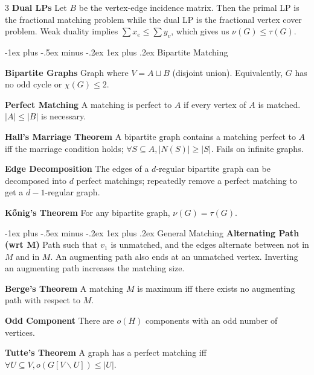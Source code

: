 \documentclass[10pt, landscape]{article}
\makeatletter
\renewcommand{\subsection}{\@startsection{subsection}{3}{0mm}%
                                {-1ex plus -.5ex minus -.2ex}%
                                {1ex plus .2ex}%
                                {\normalfont\small\bfseries}}%
\makeatother
\begin{document}
\begin{multicols*}{3}
\textbf{Dual LPs} Let $B$ be the vertex-edge incidence matrix. Then the primal LP is the fractional matching problem while the dual LP is the fractional vertex cover problem. Weak duality implies $\sum x_e \leq \sum y_v$, which gives us $\nu(G) \leq \tau(G)$.

\subsection{Bipartite Matching}

\textbf{Bipartite Graphs} Graph where $V=A \sqcup B$ (disjoint union). Equivalently, $G$ has no odd cycle or $\chi(G) \leq 2$.

\textbf{Perfect Matching} A matching is perfect to $A$ if every vertex of $A$ is matched. $|A| \leq |B|$ is necessary.

\textbf{Hall's Marriage Theorem} A bipartite graph contains a matching perfect to $A$ iff the marriage condition holds; $\forall S \subseteq A, |N(S)| \geq |S|$. Fails on infinite graphs.


\textbf{Edge Decomposition} The edges of a $d$-regular bipartite graph can be decomposed into $d$ perfect matchings; repeatedly remove a perfect matching to get a $d-1$-regular graph.


\textbf{Kőnig's Theorem} For any bipartite graph, $\nu(G)=\tau(G)$.

\subsection{General Matching}
\textbf{Alternating Path (wrt M)} Path such that $v_1$ is unmatched, and the edges alternate between not in $M$ and in $M$. An augmenting path also ends at an unmatched vertex. Inverting an augmenting path increases the matching size.

\textbf{Berge's Theorem} A matching $M$ is maximum iff there exists no augmenting path with respect to $M$.

\textbf{Odd Component} There are $o(H)$ components with an odd number of vertices.

\textbf{Tutte's Theorem} A graph has a perfect matching iff $\forall U \subseteq V, o(G[V\backslash U]) \leq |U|$.


\end{multicols*}
\end{document}
